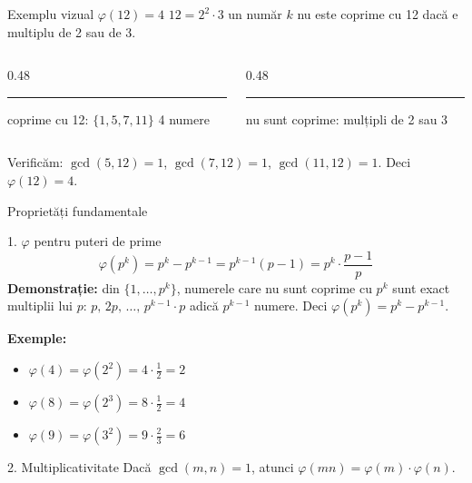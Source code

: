 \documentclass[10pt]{beamer}
\begin{document}
\begin{frame}{Exemplu vizual \textemdash{} $\varphi(12) = 4$}
  $12 = 2^2 \cdot 3$ \textemdash{} un număr $k$ nu este coprime cu 12 dacă e multiplu de 2 sau de 3.
  \begin{center}
  \end{center}
  \begin{columns}[T]
    \begin{column}{0.48\textwidth}
      \textcolor{green!60!black}{\rule{0.8em}{0.8em}} coprime cu 12: $\{1, 5, 7, 11\}$ \textemdash{} 4 numere
    \end{column}
    \begin{column}{0.48\textwidth}
      \textcolor{red!60!black}{\rule{0.8em}{0.8em}} nu sunt coprime: mulțipli de 2 sau 3
    \end{column}
  \end{columns}
  \medskip
  Verificăm: $\gcd(5, 12)=1$, $\gcd(7, 12)=1$, $\gcd(11, 12)=1$. Deci $\varphi(12) = 4$.
\end{frame}

\begin{frame}{Proprietăți fundamentale}
  \begin{block}{1. $\varphi$ pentru puteri de prime}
    \[
      \varphi(p^k) = p^k - p^{k-1} = p^{k-1}(p-1) = p^k \cdot \frac{p-1}{p}
    \]
    \textbf{Demonstrație:} din $\{1, \ldots, p^k\}$, numerele care nu sunt coprime
    cu $p^k$ sunt exact multiplii lui $p$: $p,\, 2p,\, \ldots,\, p^{k-1} \cdot p$
    \textemdash{} adică $p^{k-1}$ numere.
    Deci $\varphi(p^k) = p^k - p^{k-1}$.
    \smallskip

    \textbf{Exemple:}
    \begin{itemize}\itemsep1pt
      \item $\varphi(4) = \varphi(2^2) = 4 \cdot \frac{1}{2} = 2$
      \item $\varphi(8) = \varphi(2^3) = 8 \cdot \frac{1}{2} = 4$
      \item $\varphi(9) = \varphi(3^2) = 9 \cdot \frac{2}{3} = 6$
    \end{itemize}
  \end{block}
  \smallskip
  \begin{block}{2. Multiplicativitate}
    Dacă $\gcd(m, n) = 1$, atunci $\varphi(mn) = \varphi(m) \cdot \varphi(n)$.
  \end{block}
\end{frame}
\end{document}
